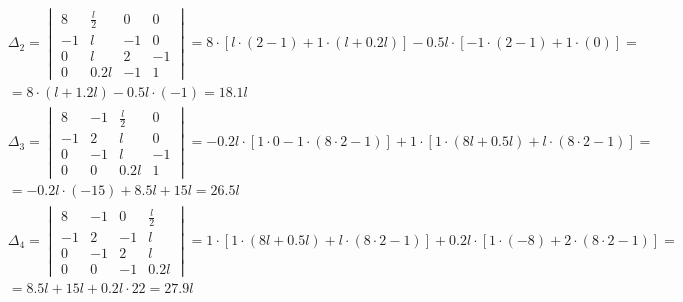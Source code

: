 \begin{equation}
    \label{eq6.13}
    \begin{split}
        & \Delta_2 = 
        \begin{vmatrix}
            8 & \displaystyle \frac{l}{2} & 0 & 0
            \\
            -1 & l & -1 & 0
            \\
            0 & l & 2 & -1
            \\
            0 & 0.2l & -1 & 1
        \end{vmatrix}
        = 8 \cdot [l \cdot (2 - 1) + 1 \cdot (l + 0.2l)] - 0.5l \cdot [-1 \cdot (2 - 1) + 1 \cdot (0)] =
        \\
        & = 8 \cdot (l + 1.2l) - 0.5l \cdot (-1) = 18.1l
    \end{split}
\end{equation}
\begin{equation}
    \label{eq6.13.1}
    \begin{split}
        & \Delta_3 =
        \begin{vmatrix}
            8 & -1 & \displaystyle \frac{l}{2} & 0
            \\
            -1 & 2 & l & 0
            \\
            0 & -1 & l & -1
            \\
            0 & 0 & 0.2l & 1
        \end{vmatrix}
        = -0.2l \cdot [1 \cdot 0 - 1 \cdot (8 \cdot 2 - 1)] + 1 \cdot [1 \cdot (8l + 0.5l) + l \cdot (8 \cdot 2 - 1)] = 
        \\
        & = -0.2l \cdot (-15) + 8.5l + 15l = 26.5l
    \end{split}
\end{equation}
\begin{equation}
    \label{eq6.13.2}
    \begin{split}
        & \Delta_4 =
        \begin{vmatrix}
            8 & -1 & 0 & \displaystyle \frac{l}{2}
            \\
            -1 & 2 & -1 & l
            \\
            0 & -1 & 2 & l
            \\
            0 & 0 & -1 & 0.2l
        \end{vmatrix}
        = 1 \cdot [1 \cdot (8l + 0.5l) + l \cdot (8 \cdot 2 - 1)] + 0.2l \cdot [1 \cdot (-8) + 2 \cdot (8 \cdot 2 - 1)] =
        \\
        & = 8.5l + 15l + 0.2l \cdot 22 = 27.9l
    \end{split}
\end{equation}

